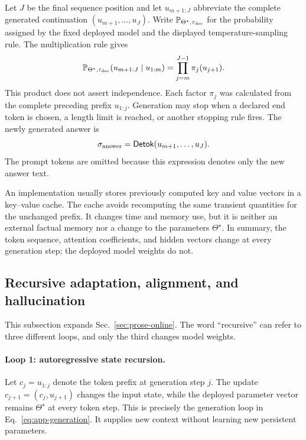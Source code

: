 \documentclass[
  aps,
  reprint,
  superscriptaddress,
  floatfix,
  nofootinbib,
  longbibliography
]{revtex4-2}
\newcommand{\Prob}{\mathbb{P}}
\begin{document}
Let $J$ be the final sequence position and let $u_{m+1:J}$ abbreviate the
complete generated continuation $(u_{m+1},\ldots,u_J)$.  Write
$\Prob_{\Theta^\star,\tau_{\rm dec}}$ for the probability assigned by the fixed
deployed model and the displayed temperature-sampling rule.  The multiplication
rule gives
\begin{equation}
\label{eq:app-generation-chain}
\Prob_{\Theta^\star,\tau_{\rm dec}}
(u_{m+1:J}\mid u_{1:m})
=\prod_{j=m}^{J-1}\pi_j(u_{j+1}).
\end{equation}
This product does not assert independence.  Each factor $\pi_j$ was calculated
from the complete preceding prefix $u_{1:j}$.  Generation may stop when a
declared end token is chosen, a length limit is reached, or another stopping
rule fires.  The newly generated answer is
\begin{equation}
\label{eq:app-detokenization}
\sigma_{\rm answer}
=\mathsf{Detok}(u_{m+1},\ldots,u_J).
\end{equation}
The prompt tokens are omitted because this expression denotes only the new
answer text.

An implementation usually stores previously computed key and value vectors in
a key--value cache.  The cache avoids recomputing the same transient quantities
for the unchanged prefix.  It changes time and memory use, but it is neither an
external factual memory nor a change to the parameters $\Theta^\star$.  In
summary, the token sequence, attention coefficients, and hidden vectors change
at every generation step; the deployed model weights do not.

\subsection{Recursive adaptation, alignment, and hallucination}
\label{app:online}

This subsection expands Sec.~\ref{sec:prose-online}.  The word ``recursive'' can
refer to three different loops, and only the third changes model weights.

\paragraph{Loop 1: autoregressive state recursion.}
Let $c_j=u_{1:j}$ denote the token prefix at generation step $j$.  The update
$c_{j+1}=(c_j,u_{j+1})$ changes the input state, while the deployed parameter
vector remains $\Theta^\star$ at every token step.  This is precisely the
generation loop in Eq.~\eqref{eq:app-generation}.  It supplies new context
without learning new persistent parameters.
\end{document}

